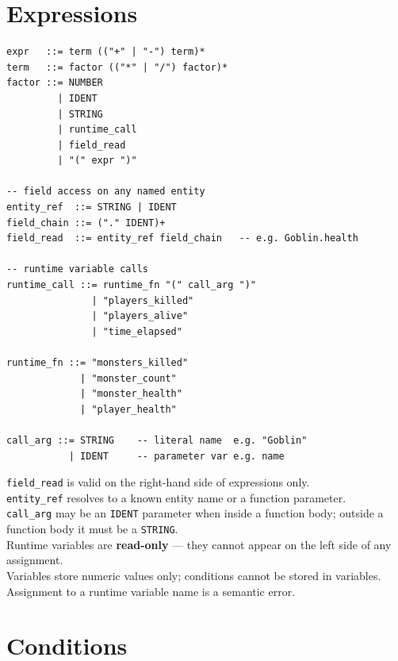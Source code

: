\documentclass[12pt,a4paper]{article}
\begin{document}
\section{Expressions}

\begin{lstlisting}[style=bnf]
expr   ::= term (("+" | "-") term)*
term   ::= factor (("*" | "/") factor)*
factor ::= NUMBER
         | IDENT
         | STRING
         | runtime_call
         | field_read
         | "(" expr ")"

-- field access on any named entity
entity_ref  ::= STRING | IDENT
field_chain ::= ("." IDENT)+
field_read  ::= entity_ref field_chain   -- e.g. Goblin.health

-- runtime variable calls
runtime_call ::= runtime_fn "(" call_arg ")"
               | "players_killed"
               | "players_alive"
               | "time_elapsed"

runtime_fn ::= "monsters_killed"
             | "monster_count"
             | "monster_health"
             | "player_health"

call_arg ::= STRING    -- literal name  e.g. "Goblin"
           | IDENT     -- parameter var e.g. name
\end{lstlisting}

\begin{cbox}
\texttt{field\_read} is valid on the right-hand side of expressions only.\\
\texttt{entity\_ref} resolves to a known entity name or a function parameter.\\
\texttt{call\_arg} may be an \texttt{IDENT} parameter when inside a function body;
outside a function body it must be a \texttt{STRING}.\\
Runtime variables are \textbf{read-only} --- they cannot appear on the left side of any assignment.\\
Variables store numeric values only; conditions cannot be stored in variables.\\
Assignment to a runtime variable name is a semantic error.
\end{cbox}

\section{Conditions}
\end{document}
